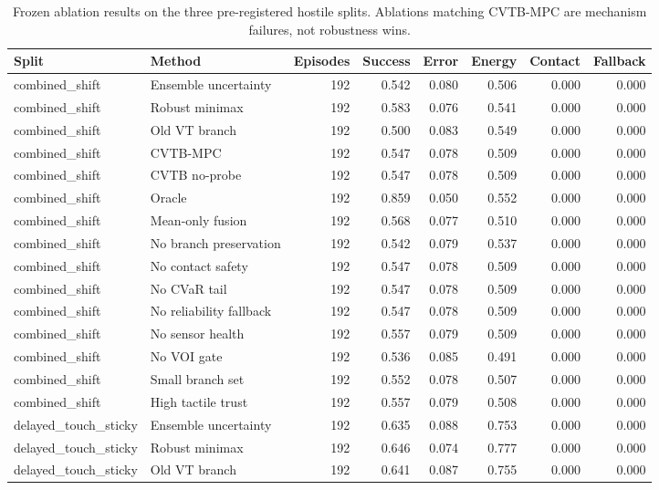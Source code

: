 \begin{table}[t]
\centering
\caption{Frozen ablation results on the three pre-registered hostile splits. Ablations matching CVTB-MPC are mechanism failures, not robustness wins.}
\label{tab:ablation}
\scriptsize
\begin{tabular}{llrrrrrr}
\toprule
Split & Method & Episodes & Success & Error & Energy & Contact & Fallback \\
\midrule
combined\_shift & Ensemble uncertainty & 192 & 0.542 & 0.080 & 0.506 & 0.000 & 0.000 \\
combined\_shift & Robust minimax & 192 & 0.583 & 0.076 & 0.541 & 0.000 & 0.000 \\
combined\_shift & Old VT branch & 192 & 0.500 & 0.083 & 0.549 & 0.000 & 0.000 \\
combined\_shift & CVTB-MPC & 192 & 0.547 & 0.078 & 0.509 & 0.000 & 0.000 \\
combined\_shift & CVTB no-probe & 192 & 0.547 & 0.078 & 0.509 & 0.000 & 0.000 \\
combined\_shift & Oracle & 192 & 0.859 & 0.050 & 0.552 & 0.000 & 0.000 \\
combined\_shift & Mean-only fusion & 192 & 0.568 & 0.077 & 0.510 & 0.000 & 0.000 \\
combined\_shift & No branch preservation & 192 & 0.542 & 0.079 & 0.537 & 0.000 & 0.000 \\
combined\_shift & No contact safety & 192 & 0.547 & 0.078 & 0.509 & 0.000 & 0.000 \\
combined\_shift & No CVaR tail & 192 & 0.547 & 0.078 & 0.509 & 0.000 & 0.000 \\
combined\_shift & No reliability fallback & 192 & 0.547 & 0.078 & 0.509 & 0.000 & 0.000 \\
combined\_shift & No sensor health & 192 & 0.557 & 0.079 & 0.509 & 0.000 & 0.000 \\
combined\_shift & No VOI gate & 192 & 0.536 & 0.085 & 0.491 & 0.000 & 0.000 \\
combined\_shift & Small branch set & 192 & 0.552 & 0.078 & 0.507 & 0.000 & 0.000 \\
combined\_shift & High tactile trust & 192 & 0.557 & 0.079 & 0.508 & 0.000 & 0.000 \\
delayed\_touch\_sticky & Ensemble uncertainty & 192 & 0.635 & 0.088 & 0.753 & 0.000 & 0.000 \\
delayed\_touch\_sticky & Robust minimax & 192 & 0.646 & 0.074 & 0.777 & 0.000 & 0.000 \\
delayed\_touch\_sticky & Old VT branch & 192 & 0.641 & 0.087 & 0.755 & 0.000 & 0.000 \\

\end{tabular}
\end{table}
